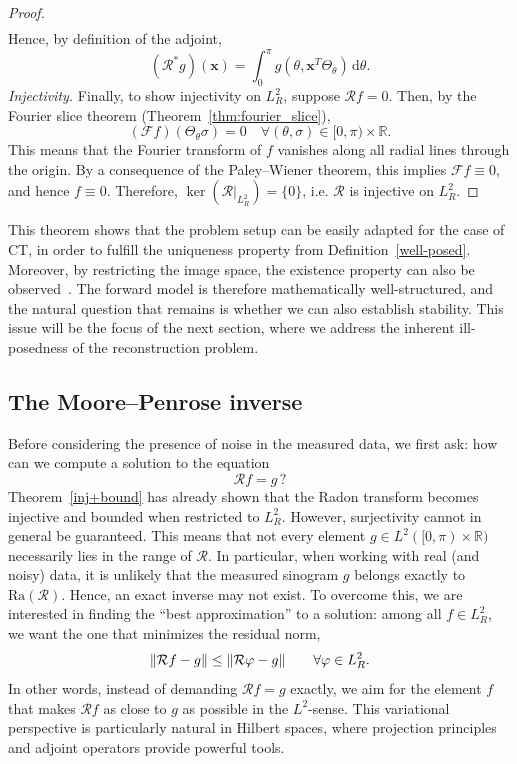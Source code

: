 \documentclass[12pt,a4paper]{article}
\begin{document}
\begin{proof}
\begin{align*}
\end{align*}
Hence, by definition of the adjoint,
\[
(\mathcal{R}^* g)(\mathbf{x}) = \int_0^\pi g(\theta, \mathbf{x}^T \Theta_\theta)\,\mathrm{d}\theta .
\]
\newline\newline
\emph{Injectivity.}  
Finally, to show injectivity on $L^2_R$, suppose $\mathcal{R} f = 0$. Then, by the Fourier slice theorem (Theorem~\ref{thm:fourier_slice}),
\[
(\mathcal{F} f)(\Theta_\theta \sigma) = 0 \quad \forall (\theta,\sigma) \in [0,\pi)\times\mathbb{R}.
\]
This means that the Fourier transform of $f$ vanishes along all radial lines through the origin. By a consequence of the Paley--Wiener theorem, this implies $\mathcal{F} f \equiv 0$, and hence $f \equiv 0$. Therefore, $\ker(\mathcal{R}|_{L^2_R}) = \{0\}$, i.e. $\mathcal{R}$ is injective on $L^2_R$.
\end{proof}
This theorem shows that the problem setup can be easily adapted for the case of CT, in order to fulfill the uniqueness property from Definition~\ref{well-posed}. Moreover, by restricting the image space, the existence property can also be observed~\cite{math_of_ct_wald}. The forward model is therefore mathematically well-structured, and the natural question that remains is whether we can also establish stability. This issue will be the focus of the next section, where we address the inherent ill-posedness of the reconstruction problem.




\subsection{The Moore--Penrose inverse}
\label{sec:moore-penrose}

Before considering the presence of noise in the measured data, we first ask: how can we compute a solution to the equation
\[
    \mathcal{R} f = g \, ?
\]
Theorem~\ref{inj+bound} has already shown that the Radon transform becomes injective and bounded when restricted to $L^2_R$. However, surjectivity cannot in general be guaranteed. This means that not every element $g \in L^2([0,\pi)\times \mathbb{R})$ necessarily lies in the range of $\mathcal{R}$. In particular, when working with real (and noisy) data, it is unlikely that the measured sinogram $g$ belongs exactly to $\mathrm{Ra}(\mathcal{R})$. Hence, an exact inverse may not exist. 
\newline\newline
To overcome this, we are interested in finding the ``best approximation'' to a solution: among all $f \in L^2_R$, we want the one that minimizes the residual norm,
\[
    \norm{\mathcal{R} f - g} \leq \norm{\mathcal{R} \varphi - g}
    \qquad \forall\varphi \in L^2_R.
\]
In other words, instead of demanding $\mathcal{R} f = g$ exactly, we aim for the element $f$ that makes $\mathcal{R} f$ as close to $g$ as possible in the $L^2$-sense. This variational perspective is particularly natural in Hilbert spaces, where projection principles and adjoint operators provide powerful tools.
\end{document}
